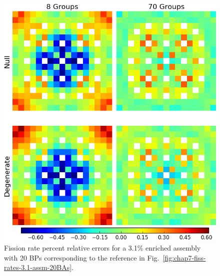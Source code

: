 \begin{figure}[h!]
\centering
\includegraphics[width=\linewidth]{figures/quantification/assm-31-20BPs/fiss-err}
\vspace{2mm}
\caption[Fission rate errors for a 3.1\% enriched assembly with 20 BPs]{Fission rate percent relative errors for a 3.1\% enriched assembly with 20 BPs corresponding to the reference in Fig.~\ref{fig:chap7-fiss-rates-3.1-assm-20BAs}.}
\label{fig:chap8-assm-3.1-20BPs-fiss-err}
\end{figure}

\clearpage

